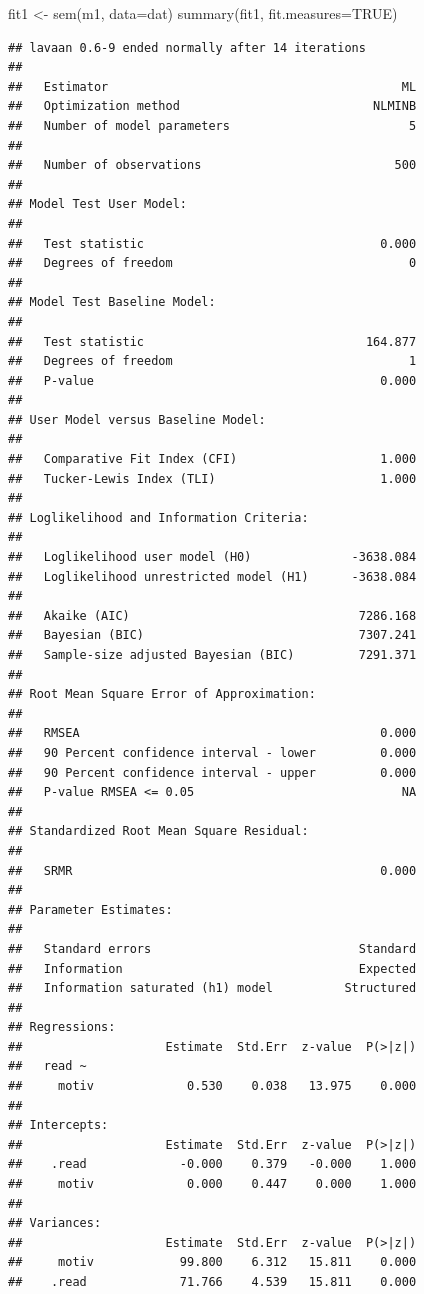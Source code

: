 \documentclass[
]{article}
\newenvironment{Shaded}{\begin{snugshade}}{\end{snugshade}}
\newcommand{\AttributeTok}[1]{\textcolor[rgb]{0.77,0.63,0.00}{#1}}
\newcommand{\ConstantTok}[1]{\textcolor[rgb]{0.00,0.00,0.00}{#1}}
\newcommand{\FunctionTok}[1]{\textcolor[rgb]{0.00,0.00,0.00}{#1}}
\newcommand{\NormalTok}[1]{#1}
\newcommand{\OtherTok}[1]{\textcolor[rgb]{0.56,0.35,0.01}{#1}}
\begin{document}
\begin{Shaded}
\begin{Highlighting}[]
\NormalTok{fit1 }\OtherTok{\textless{}{-}} \FunctionTok{sem}\NormalTok{(m1, }\AttributeTok{data=}\NormalTok{dat)}
\FunctionTok{summary}\NormalTok{(fit1, }\AttributeTok{fit.measures=}\ConstantTok{TRUE}\NormalTok{)}
\end{Highlighting}
\end{Shaded}

\begin{verbatim}
## lavaan 0.6-9 ended normally after 14 iterations
## 
##   Estimator                                         ML
##   Optimization method                           NLMINB
##   Number of model parameters                         5
##                                                       
##   Number of observations                           500
##                                                       
## Model Test User Model:
##                                                       
##   Test statistic                                 0.000
##   Degrees of freedom                                 0
## 
## Model Test Baseline Model:
## 
##   Test statistic                               164.877
##   Degrees of freedom                                 1
##   P-value                                        0.000
## 
## User Model versus Baseline Model:
## 
##   Comparative Fit Index (CFI)                    1.000
##   Tucker-Lewis Index (TLI)                       1.000
## 
## Loglikelihood and Information Criteria:
## 
##   Loglikelihood user model (H0)              -3638.084
##   Loglikelihood unrestricted model (H1)      -3638.084
##                                                       
##   Akaike (AIC)                                7286.168
##   Bayesian (BIC)                              7307.241
##   Sample-size adjusted Bayesian (BIC)         7291.371
## 
## Root Mean Square Error of Approximation:
## 
##   RMSEA                                          0.000
##   90 Percent confidence interval - lower         0.000
##   90 Percent confidence interval - upper         0.000
##   P-value RMSEA <= 0.05                             NA
## 
## Standardized Root Mean Square Residual:
## 
##   SRMR                                           0.000
## 
## Parameter Estimates:
## 
##   Standard errors                             Standard
##   Information                                 Expected
##   Information saturated (h1) model          Structured
## 
## Regressions:
##                    Estimate  Std.Err  z-value  P(>|z|)
##   read ~                                              
##     motiv             0.530    0.038   13.975    0.000
## 
## Intercepts:
##                    Estimate  Std.Err  z-value  P(>|z|)
##    .read             -0.000    0.379   -0.000    1.000
##     motiv             0.000    0.447    0.000    1.000
## 
## Variances:
##                    Estimate  Std.Err  z-value  P(>|z|)
##     motiv            99.800    6.312   15.811    0.000
##    .read             71.766    4.539   15.811    0.000
\end{verbatim}
\end{document}
